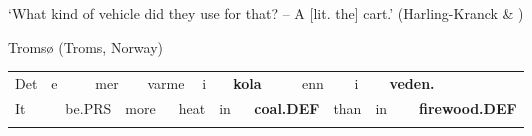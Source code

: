 \begin{styleTranslation}
‘What kind of vehicle did they use for that? – A [lit. the] cart.’ (Harling-Kranck \& \citet[42]{Mara1998})

\end{styleTranslation}

\begin{listWWNumileveli}
\item {}

\begin{styleExample}
Tromsø (Troms, Norway)

\end{styleExample}

\end{listWWNumileveli}

\begin{listWWNumxviileveli}
\item {}

\end{listWWNumxviileveli}

\begin{tabular}{llllllllllllllllll}
\lsptoprule
Det & \multicolumn{2}{l}{e

} & \multicolumn{2}{l}{mer

} & \multicolumn{2}{l}{varme

} & \multicolumn{2}{l}{i

} & \multicolumn{2}{l}{{\bfseries kola}

} & \multicolumn{2}{l}{enn

} & \multicolumn{2}{l}{i

} & \multicolumn{2}{l}{{\bfseries veden.}

} & \\
\multicolumn{2}{l}{It

} & \multicolumn{2}{l}{be.PRS

} & \multicolumn{2}{l}{more

} & \multicolumn{2}{l}{heat

} & \multicolumn{2}{l}{in

} & \multicolumn{2}{l}{{\bfseries coal.DEF}

} & \multicolumn{2}{l}{than

} & \multicolumn{2}{l}{in

} & \multicolumn{2}{l}{{\bfseries firewood.DEF}

}\\
\lspbottomrule
\end{tabular}

